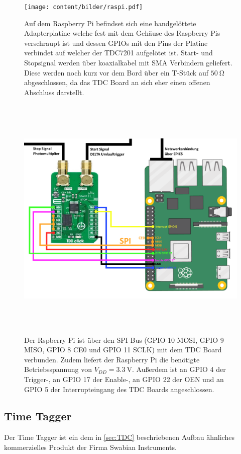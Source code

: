 \begin{figure}
  \centering
  \texttt{[image: content/bilder/raspi.pdf]}
  \caption{Auf dem Raspberry Pi befindset sich eine handgelöttete Adapterplatine welche fest mit dem Gehäuse
    des Raspberry Pis verschraupt ist und dessen GPIOs mit den Pins der Platine verbindet auf welcher der TDC7201
    aufgelötet ist. Start- und Stopsignal werden über koaxialkabel mit SMA Verbindern geliefert. Diese werden noch
    kurz vor dem Bord über ein T-Stück auf $\SI{50}{\ohm}$ abgeschlossen, da das TDC Board an sich eher einen offenen
    Abschluss darstellt.}
  \label{fig:raspi}
\end{figure}

\begin{figure}
  \centering
  \includegraphics[width=16cm, height=12cm]{content/bilder/RaspiTdcSchaltung.pdf}
  \caption{Der Rspberry Pi ist über den SPI Bus (GPIO 10 MOSI, GPIO 9 MISO, GPIO 8 CE0 und GPIO 11 SCLK) mit dem TDC Board verbunden. 
    Zudem liefert der Raspberry Pi die benötigte Betriebsspannung von $V_{DD}=\SI{3,3}{\volt}$. Außerdem ist an GPIO 4 der
    Trigger-, an GPIO 17 der Enable-, an GPIO 22 der OEN und an GPIO 5 der Interrupteingang des TDC Boards angeschlossen. } 
  \label{fig:raspitdcschaltung}
\end{figure}

\subsection{Time Tagger}
\label{sec:TimeTagger}
Der Time Tagger ist ein dem in \autoref{sec:TDC} beschriebenen Aufbau ähnliches kommerzielles Produkt
der Firma Swabian Instruments.